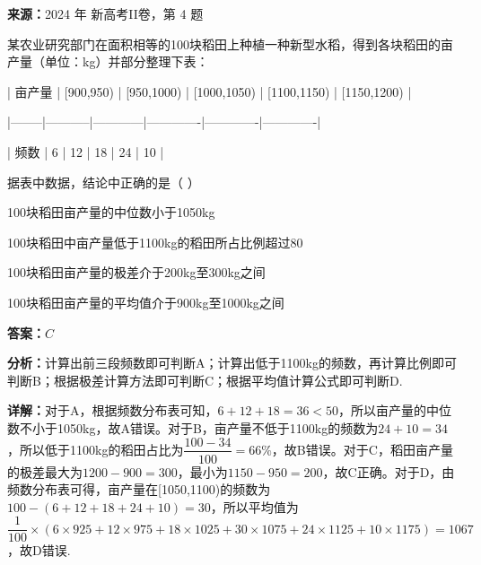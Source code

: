 \begin{question}[points=5]
\textbf{来源：}2024 年 新高考II卷，第 4 题\par
某农业研究部门在面积相等的100块稻田上种植一种新型水稻，得到各块稻田的亩产量（单位：kg）并部分整理下表：



| 亩产量 | [900,950) | [950,1000) | [1000,1050) | [1100,1150) | [1150,1200) |

|--------|-----------|------------|-------------|-------------|-------------|

| 频数   | 6         | 12         | 18          | 24          | 10          |



据表中数据，结论中正确的是（ ）
\begin{choices}
  \item 100块稻田亩产量的中位数小于1050kg
  \item 100块稻田中亩产量低于1100kg的稻田所占比例超过80%
  \item 100块稻田亩产量的极差介于200kg至300kg之间
  \item 100块稻田亩产量的平均值介于900kg至1000kg之间
\end{choices}
\begin{solution}
\textbf{答案：}$C$

\textbf{分析：}计算出前三段频数即可判断A；计算出低于1100kg的频数，再计算比例即可判断B；根据极差计算方法即可判断C；根据平均值计算公式即可判断D.

\textbf{详解：}对于A，根据频数分布表可知，$6+12+18=36<50$，所以亩产量的中位数不小于1050kg，故A错误。对于B，亩产量不低于1100kg的频数为$24+10=34$，所以低于1100kg的稻田占比为$\dfrac{100-34}{100}=66\%$，故B错误。对于C，稻田亩产量的极差最大为$1200-900=300$，最小为$1150-950=200$，故C正确。对于D，由频数分布表可得，亩产量在[1050,1100)的频数为$100-(6+12+18+24+10)=30$，所以平均值为$\dfrac{1}{100}\times(6\times925+12\times975+18\times1025+30\times1075+24\times1125+10\times1175)=1067$，故D错误.
\end{solution}
\end{question}

